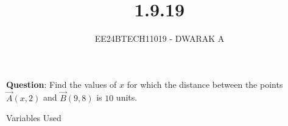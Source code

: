 \documentclass[journal]{IEEEtran}
\begin{document}

\vspace{3cm}

\title{1.9.19}
\author{EE24BTECH11019 - DWARAK A}
{\let\newpage\relax\maketitle}

\renewcommand{\thefigure}{\theenumi}
\renewcommand{\thetable}{\theenumi}
\setlength{\intextsep}{10pt} %


\renewcommand{\thetable}{\theenumi}


\textbf{Question}:
Find the values of $x$ for which the distance between the points $\vec{A}(x, 2)$ and $\vec{B}(9, 8)$ is $10$ units.

\solution
\begin{table}[h!]    
  \centering
  
  \caption{Variables Used}
  \label{tab1.9.19.1}
\end{table}
\end{document}
